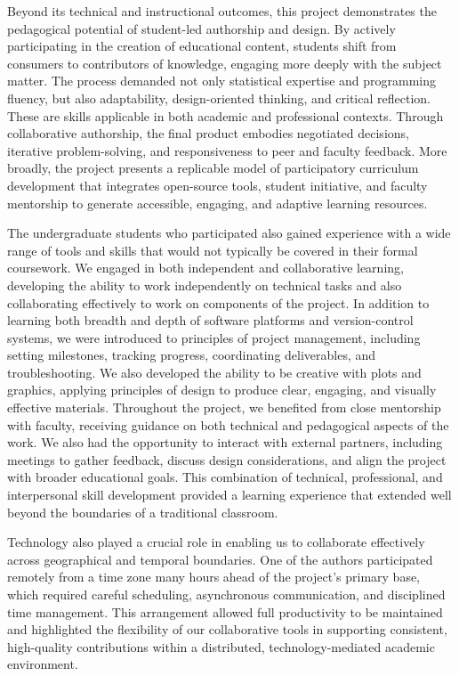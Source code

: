 \documentclass[11pt]{article}
\begin{document}
Beyond its technical and instructional outcomes, this project demonstrates the pedagogical potential of student-led authorship and design. By actively participating in the creation of educational content, students shift from consumers to contributors of knowledge, engaging more deeply with the subject matter.
The process demanded not only statistical expertise and programming fluency, but also adaptability, design-oriented thinking, and critical reflection.
These are skills applicable in both academic and professional contexts. Through collaborative authorship, the final product embodies negotiated decisions, iterative problem-solving, and responsiveness to peer and faculty feedback.
More broadly, the project presents a replicable model of participatory curriculum development that integrates open-source tools, student initiative, and faculty mentorship to generate accessible, engaging, and adaptive learning resources.

The undergraduate students who participated also gained experience with a wide range of tools and skills that would not typically be covered in their formal coursework.
We engaged in both independent and collaborative learning, developing the ability to work independently on technical tasks and also collaborating effectively to work on components of the project.
In addition to learning both breadth and depth of software platforms and version-control systems, we were introduced to principles of project management, including setting milestones, tracking progress, coordinating deliverables, and troubleshooting.
We also developed the ability to be creative with plots and graphics, applying principles of design to produce clear, engaging, and visually effective materials.
Throughout the project, we benefited from close mentorship with faculty, receiving guidance on both technical and pedagogical aspects of the work.
We also had the opportunity to interact with external partners, including meetings to gather feedback, discuss design considerations, and align the project with broader educational goals.
This combination of technical, professional, and interpersonal skill development provided a learning experience that extended well beyond the boundaries of a traditional classroom.

Technology also played a crucial role in enabling us to collaborate effectively across geographical and temporal boundaries. One of the authors participated remotely from a time zone many hours ahead of the project’s primary base, which required careful scheduling, asynchronous communication, and disciplined time management. This arrangement allowed full productivity to be maintained and highlighted the flexibility of our collaborative tools in supporting consistent, high-quality contributions within a distributed, technology-mediated academic environment.
\end{document}
